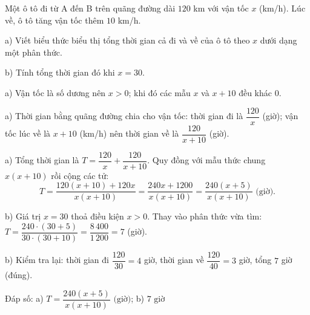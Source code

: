 \begin{problem}[8DS-PS-006]
Một ô tô đi từ A đến B trên quãng đường dài $120$ km với vận tốc $x$ (km/h). Lúc về, ô tô tăng vận tốc thêm $10$ km/h.

a) Viết biểu thức biểu thị tổng thời gian cả đi và về của ô tô theo $x$ dưới dạng một phân thức.

b) Tính tổng thời gian đó khi $x = 30$.

\begin{solution}
a) Vận tốc là số dương nên $x > 0$; khi đó các mẫu $x$ và $x + 10$ đều khác $0$.

a) Thời gian bằng quãng đường chia cho vận tốc: thời gian đi là $\dfrac{120}{x}$ (giờ); vận tốc lúc về là $x + 10$ (km/h) nên thời gian về là $\dfrac{120}{x + 10}$ (giờ).

a) Tổng thời gian là $T = \dfrac{120}{x} + \dfrac{120}{x + 10}$. Quy đồng với mẫu thức chung $x(x + 10)$ rồi cộng các tử:
\[ T = \dfrac{120(x + 10) + 120x}{x(x + 10)} = \dfrac{240x + 1200}{x(x + 10)} = \dfrac{240(x + 5)}{x(x + 10)} \text{ (giờ)}. \]

b) Giá trị $x = 30$ thoả điều kiện $x > 0$. Thay vào phân thức vừa tìm: $T = \dfrac{240 \cdot (30 + 5)}{30 \cdot (30 + 10)} = \dfrac{8\,400}{1\,200} = 7$ (giờ).

b) Kiểm tra lại: thời gian đi $\dfrac{120}{30} = 4$ giờ, thời gian về $\dfrac{120}{40} = 3$ giờ, tổng $7$ giờ (đúng).

Đáp số: a) $\boxed{T = \dfrac{240(x + 5)}{x(x + 10)} \text{ (giờ)}}$; b) $\boxed{7 \text{ giờ}}$
\end{solution}
\end{problem}

